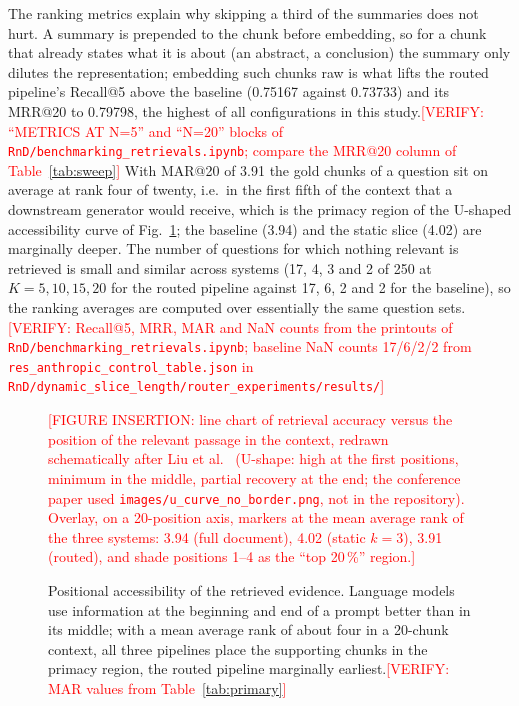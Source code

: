 \documentclass[pdflatex,sn-mathphys-num]{sn-jnl}
\makeatletter
\newcommand{\todo}[1]{\textcolor{red}{#1}}
\newcommand{\verify}[1]{\todo{[VERIFY: #1]}}
\newcommand{\Rec}[1]{Recall@#1}
\newcommand{\MRR}[1]{MRR@#1}
\newcommand{\MAR}[1]{MAR@#1}
\theoremstyle{thmstyleone}%
\theoremstyle{thmstylethree}%
\makeatother
\begin{document}
The ranking metrics explain why skipping a third of the summaries does not hurt. A summary is prepended to the chunk before embedding, so for a chunk that already states what it is about (an abstract, a conclusion) the summary only dilutes the representation; embedding such chunks raw is what lifts the routed pipeline's \Rec{5} above the baseline (0.75167 against 0.73733) and its \MRR{20} to 0.79798, the highest of all configurations in this study.\verify{``METRICS AT N=5'' and ``N=20'' blocks of \texttt{RnD/benchmarking\_retrievals.ipynb}; compare the \MRR{20} column of Table~\ref{tab:sweep}} With \MAR{20} of 3.91 the gold chunks of a question sit on average at rank four of twenty, i.e.\ in the first fifth of the context that a downstream generator would receive, which is the primacy region of the U-shaped accessibility curve of Fig.~\ref{fig:ucurve}; the baseline (3.94) and the static slice (4.02) are marginally deeper. The number of questions for which nothing relevant is retrieved is small and similar across systems (17, 4, 3 and 2 of 250 at $K=5,10,15,20$ for the routed pipeline against 17, 6, 2 and 2 for the baseline), so the ranking averages are computed over essentially the same question sets.\verify{\Rec{5}, MRR, MAR and NaN counts from the printouts of \texttt{RnD/benchmarking\_retrievals.ipynb}; baseline NaN counts 17/6/2/2 from \texttt{res\_anthropic\_control\_table.json} in \texttt{RnD/dynamic\_slice\_length/router\_experiments/results/}}

\begin{figure}[htbp]
  \centering
  \todo{[FIGURE INSERTION: line chart of retrieval accuracy versus the position of the relevant passage in the context, redrawn schematically after Liu et al.\ \cite{liu2023lostmiddlelanguagemodels} (U-shape: high at the first positions, minimum in the middle, partial recovery at the end; the conference paper used \texttt{images/u\_curve\_no\_border.png}, not in the repository). Overlay, on a 20-position axis, markers at the mean average rank of the three systems: 3.94 (full document), 4.02 (static $k=3$), 3.91 (routed), and shade positions 1--4 as the ``top 20\,\%'' region.]}
  \caption{Positional accessibility of the retrieved evidence. Language models use information at the beginning and end of a prompt better than in its middle; with a mean average rank of about four in a 20-chunk context, all three pipelines place the supporting chunks in the primacy region, the routed pipeline marginally earliest.\verify{MAR values from Table~\ref{tab:primary}}}
  \label{fig:ucurve}
\end{figure}
\end{document}
